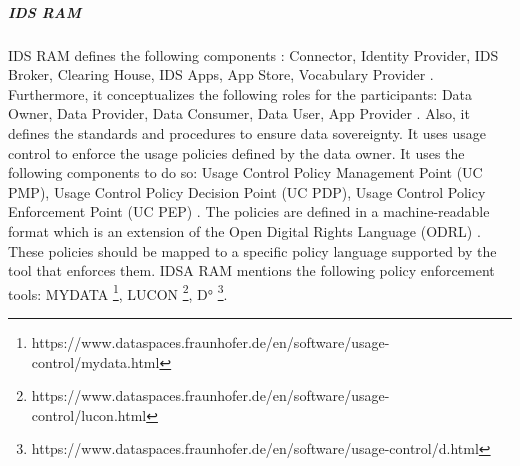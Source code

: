 \documentclass{article}
\begin{document}
\subparagraph{IDS RAM}
IDS RAM defines the following components \cite{otto_ids_2019}:
Connector, Identity Provider, IDS Broker, Clearing House, IDS Apps, App Store, Vocabulary Provider \cite{pettenpohl_international_2022}.
Furthermore, it conceptualizes the following roles for the participants:
Data Owner, Data Provider, Data Consumer, Data User, App Provider
\cite{pettenpohl_international_2022}.
Also, it defines the standards and procedures to ensure data sovereignty. It uses usage control to enforce the usage policies defined by the data owner. It uses the following components to do so: Usage Control Policy Management Point (UC PMP), Usage Control Policy Decision Point (UC PDP), Usage Control Policy Enforcement Point (UC PEP) \cite{otto_evolution_2022}.
The policies are defined in a machine-readable format which is an extension of the Open Digital Rights Language (ODRL) \cite{eitel_usage_2021}. These policies should be mapped to a specific policy language supported by the tool that enforces them. IDSA RAM mentions the following policy enforcement tools: MYDATA \footnote{https://www.dataspaces.fraunhofer.de/en/software/usage-control/mydata.html}, LUCON \footnote{https://www.dataspaces.fraunhofer.de/en/software/usage-control/lucon.html}, D° \footnote{https://www.dataspaces.fraunhofer.de/en/software/usage-control/d.html}. 
\end{document}
